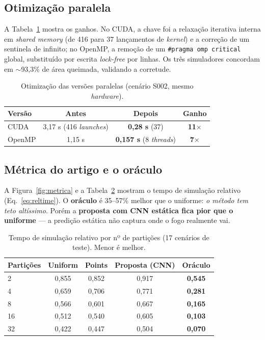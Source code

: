 \documentclass[12pt]{article}
\begin{document}
\subsection{Otimização paralela}

A Tabela~\ref{tab:par} mostra os ganhos. No CUDA, a chave foi a relaxação iterativa
interna em \textit{shared memory} (de 416 para 37 lançamentos de \textit{kernel}) e
a correção de um sentinela de infinito; no OpenMP, a remoção de um
\texttt{\#pragma omp critical} global, substituído por escrita \textit{lock-free}
por linhas. Os três simuladores concordam em $\sim$93,3\% de área queimada,
validando a corretude.

\begin{table}[ht]
\centering
\caption{Otimização das versões paralelas (cenário S002, mesmo \textit{hardware}).}
\label{tab:par}
\begin{tabular}{lccc}
\toprule
\textbf{Versão} & \textbf{Antes} & \textbf{Depois} & \textbf{Ganho} \\
\midrule
CUDA   & 3,17 s (416 \textit{launches}) & \textbf{0,28 s} (37) & \textbf{11$\times$} \\
OpenMP & 1,15 s & \textbf{0,157 s} (8 \textit{threads}) & \textbf{7$\times$} \\
\bottomrule
\end{tabular}
\end{table}

\subsection{Métrica do artigo e o oráculo}

A Figura~\ref{fig:metrica} e a Tabela~\ref{tab:metrica} mostram o tempo de
simulação relativo (Eq.~\ref{eq:reltime}). O \textbf{oráculo} é 35--57\% melhor que
o uniforme: \emph{o método tem teto altíssimo}. Porém a \textbf{proposta com CNN
estática fica pior que o uniforme} --- a predição estática não captura onde o fogo
realmente vai.

\begin{table}[ht]
\centering
\caption{Tempo de simulação relativo por nº de partições (17 cenários de teste).
Menor é melhor.}
\label{tab:metrica}
\begin{tabular}{lcccc}
\toprule
\textbf{Partições} & \textbf{Uniform} & \textbf{Points} & \textbf{Proposta (CNN)} & \textbf{Oráculo} \\
\midrule
2  & 0,855 & 0,852 & 0,917 & \textbf{0,545} \\
4  & 0,659 & 0,706 & 0,771 & \textbf{0,281} \\
8  & 0,566 & 0,601 & 0,667 & \textbf{0,165} \\
16 & 0,512 & 0,540 & 0,605 & \textbf{0,103} \\
32 & 0,422 & 0,447 & 0,504 & \textbf{0,070} \\
\bottomrule
\end{tabular}
\end{table}
\end{document}
